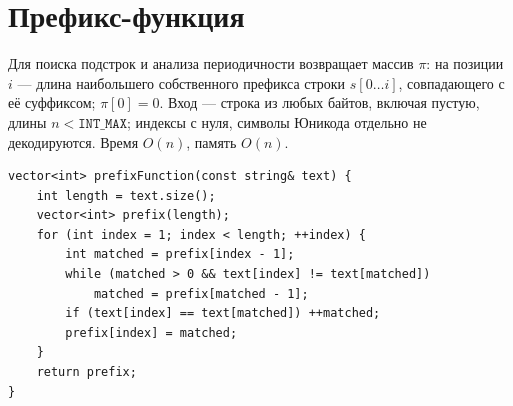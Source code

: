 \section{Префикс-функция}
Для поиска подстрок и анализа периодичности возвращает массив $\pi$: на позиции $i$ --- длина наибольшего собственного префикса строки $s[0\ldots i]$, совпадающего с её суффиксом; $\pi[0]=0$.
Вход --- строка из любых байтов, включая пустую, длины $n<\texttt{INT\_MAX}$; индексы с нуля, символы Юникода отдельно не декодируются.
Время $O(n)$, память $O(n)$.
\begin{lstlisting}[name=str_prefix]
vector<int> prefixFunction(const string& text) {
    int length = text.size();
    vector<int> prefix(length);
    for (int index = 1; index < length; ++index) {
        int matched = prefix[index - 1];
        while (matched > 0 && text[index] != text[matched])
            matched = prefix[matched - 1];
        if (text[index] == text[matched]) ++matched;
        prefix[index] = matched;
    }
    return prefix;
}
\end{lstlisting}
%

